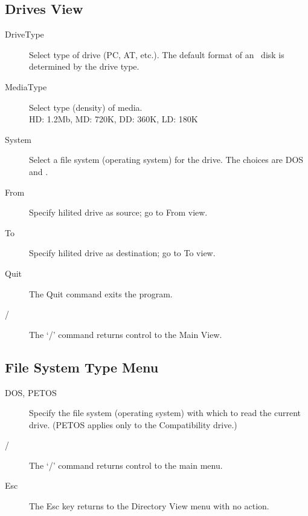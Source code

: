 \begin{itemize}
\section{Drives View}
\begin{description}
\item[DriveType]\nl
           Select type of drive (PC, AT, etc.).  The default format
           of an  \OS\ disk is determined by the drive type.
\item[MediaType]\nl
           Select type (density) of media. \\
	   HD: 1.2Mb, MD: 720K, DD: 360K, LD: 180K
\item[System]\nl
           Select a file system (operating system) for the drive.
           The choices are DOS and \OS.
\item[From]\nl
           Specify hilited drive as source; go to From view.
\item[To]\nl
           Specify hilited drive as destination; go to To view.
\item[Quit]\nl
           The Quit command exits the program.
\item[/]\nl
           The `/' command returns control to the Main View.
\end{description}


\subsection{File System Type Menu}
\begin{description}
\item[DOS, PETOS]\nl
           Specify the file system (operating system) with which
           to read the current drive.  (PETOS applies only to the
           Compatibility drive.)
\item[/]\nl
           The `/' command returns control to the main menu.
\item[Esc]\nl
           The Esc key returns to the Directory View menu with no
           action.

\end{description}


\end{itemize}
